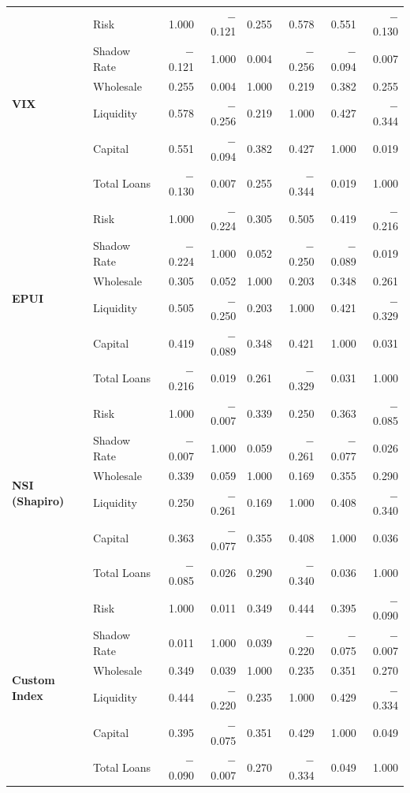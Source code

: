 \documentclass[12pt,a4paper]{report}
\begin{document}
\begin{table}[H]
{\begin{tabular}{ll rrrrrr}
\multirow{6}{*}{\textbf{VIX}}
 & Risk          &  1.000 & $-$0.121 &  0.255 &  0.578 &  0.551 & $-$0.130 \\
 & Shadow Rate   & $-$0.121 &  1.000 &  0.004 & $-$0.256 & $-$0.094 &  0.007 \\
 & Wholesale     &  0.255 &  0.004 &  1.000 &  0.219 &  0.382 &  0.255 \\
 & Liquidity     &  0.578 & $-$0.256 &  0.219 &  1.000 &  0.427 & $-$0.344 \\
 & Capital       &  0.551 & $-$0.094 &  0.382 &  0.427 &  1.000 &  0.019 \\
 & Total Loans   & $-$0.130 &  0.007 &  0.255 & $-$0.344 &  0.019 &  1.000 \\
\midrule

\multirow{6}{*}{\textbf{EPUI}}
 & Risk          &  1.000 & $-$0.224 &  0.305 &  0.505 &  0.419 & $-$0.216 \\
 & Shadow Rate   & $-$0.224 &  1.000 &  0.052 & $-$0.250 & $-$0.089 &  0.019 \\
 & Wholesale     &  0.305 &  0.052 &  1.000 &  0.203 &  0.348 &  0.261 \\
 & Liquidity     &  0.505 & $-$0.250 &  0.203 &  1.000 &  0.421 & $-$0.329 \\
 & Capital       &  0.419 & $-$0.089 &  0.348 &  0.421 &  1.000 &  0.031 \\
 & Total Loans   & $-$0.216 &  0.019 &  0.261 & $-$0.329 &  0.031 &  1.000 \\
\midrule

\multirow{6}{*}{\textbf{NSI (Shapiro)}}
 & Risk          &  1.000 & $-$0.007 &  0.339 &  0.250 &  0.363 & $-$0.085 \\
 & Shadow Rate   & $-$0.007 &  1.000 &  0.059 & $-$0.261 & $-$0.077 &  0.026 \\
 & Wholesale     &  0.339 &  0.059 &  1.000 &  0.169 &  0.355 &  0.290 \\
 & Liquidity     &  0.250 & $-$0.261 &  0.169 &  1.000 &  0.408 & $-$0.340 \\
 & Capital       &  0.363 & $-$0.077 &  0.355 &  0.408 &  1.000 &  0.036 \\
 & Total Loans   & $-$0.085 &  0.026 &  0.290 & $-$0.340 &  0.036 &  1.000 \\
\midrule

\multirow{6}{*}{\textbf{Custom Index}}
 & Risk          &  1.000 &  0.011 &  0.349 &  0.444 &  0.395 & $-$0.090 \\
 & Shadow Rate   &  0.011 &  1.000 &  0.039 & $-$0.220 & $-$0.075 & $-$0.007 \\
 & Wholesale     &  0.349 &  0.039 &  1.000 &  0.235 &  0.351 &  0.270 \\
 & Liquidity     &  0.444 & $-$0.220 &  0.235 &  1.000 &  0.429 & $-$0.334 \\
 & Capital       &  0.395 & $-$0.075 &  0.351 &  0.429 &  1.000 &  0.049 \\
 & Total Loans   & $-$0.090 & $-$0.007 &  0.270 & $-$0.334 &  0.049 &  1.000 \\

\bottomrule
\end{tabular}%
}
\end{table}
\end{document}
